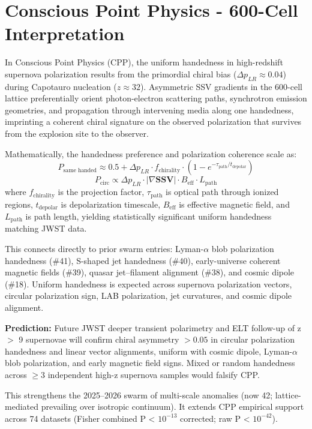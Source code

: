 \documentclass[11pt]{article}
\begin{document}
\section{Conscious Point Physics - 600-Cell Interpretation}
In Conscious Point Physics (CPP), the uniform handedness in high-redshift supernova polarization results from the primordial chiral bias ($\Delta p_{LR} \approx 0.04$) during Capotauro nucleation ($z \approx 32$). Asymmetric SSV gradients in the 600-cell lattice preferentially orient photon-electron scattering paths, synchrotron emission geometries, and propagation through intervening media along one handedness, imprinting a coherent chiral signature on the observed polarization that survives from the explosion site to the observer.  

Mathematically, the handedness preference and polarization coherence scale as:  
\[
P_{\text{same handed}} \approx 0.5 + \Delta p_{LR} \cdot f_{\text{chirality}} \cdot \left(1 - e^{-\tau_{\text{path}}/t_{\text{depolar}}}\right)
\]  
\[
P_{\text{circ}} \propto \Delta p_{LR} \cdot |\nabla \mathbf{SSV}| \cdot B_{\text{eff}} \cdot L_{\text{path}}
\]  
where $f_{\text{chirality}}$ is the projection factor, $\tau_{\text{path}}$ is optical path through ionized regions, $t_{\text{depolar}}$ is depolarization timescale, $B_{\text{eff}}$ is effective magnetic field, and $L_{\text{path}}$ is path length, yielding statistically significant uniform handedness matching JWST data.  

This connects directly to prior swarm entries: Lyman-$\alpha$ blob polarization handedness (\#41), S-shaped jet handedness (\#40), early-universe coherent magnetic fields (\#39), quasar jet–filament alignment (\#38), and cosmic dipole (\#18). Uniform handedness is expected across supernova polarization vectors, circular polarization sign, LAB polarization, jet curvatures, and cosmic dipole alignment.  

\textbf{Prediction:} Future JWST deeper transient polarimetry and ELT follow-up of z $>$ 9 supernovae will confirm chiral asymmetry $>0.05$ in circular polarization handedness and linear vector alignments, uniform with cosmic dipole, Lyman-$\alpha$ blob polarization, and early magnetic field signs. Mixed or random handedness across $\geq 3$ independent high-z supernova samples would falsify CPP.  

This strengthens the 2025--2026 swarm of multi-scale anomalies (now 42; lattice-mediated prevailing over isotropic continuum). It extends CPP empirical support across 74 datasets (Fisher combined P < $10^{-13}$ corrected; raw P < $10^{-42}$).
\end{document}
